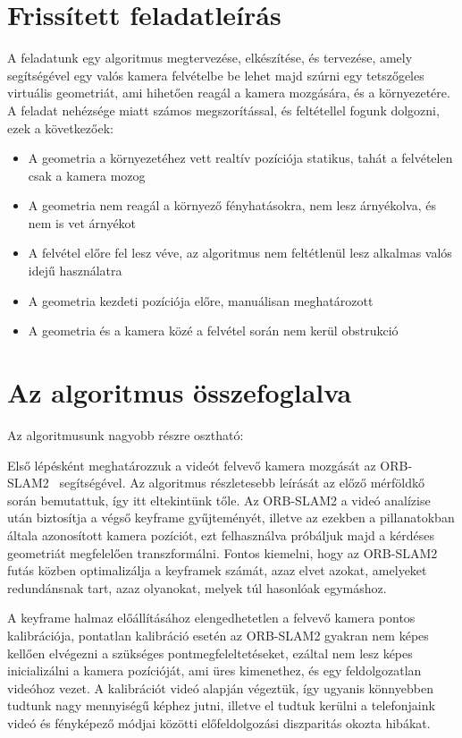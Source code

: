 \section{Frissített feladatleírás}

A feladatunk egy algoritmus megtervezése, elkészítése, és tervezése, amely segítségével egy valós kamera felvételbe be lehet majd szúrni egy tetszőgeles virtuális geometriát, ami hihetően reagál a kamera mozgására, és a környezetére.
A feladat nehézsége miatt számos megszorítással, és feltétellel fogunk dolgozni, ezek a következőek:

\begin{itemize}
	\item A geometria a környezetéhez vett realtív pozíciója statikus, tahát a felvételen csak a kamera mozog
	\item A geometria nem reagál a környező fényhatásokra, nem lesz árnyékolva, és nem is vet árnyékot
	\item A felvétel előre fel lesz véve, az algoritmus nem feltétlenül lesz alkalmas valós idejű használatra
	\item A geometria kezdeti pozíciója előre, manuálisan meghatározott
	\item A geometria és a kamera közé a felvétel során nem kerül obstrukció
\end{itemize}

\section{Az algoritmus összefoglalva}

Az algoritmusunk nagyobb részre osztható:

Első lépésként meghatározzuk a videót felvevő kamera mozgását az ORB-SLAM2~\cite{mur2015orb} segítségével.
Az algoritmus részletesebb leírását az előző mérföldkő során bemutattuk, így itt eltekintünk tőle.
Az ORB-SLAM2 a videó analízise után biztosítja a végső keyframe gyűjteményét, illetve az ezekben a pillanatokban általa azonosított kamera pozíciót, ezt felhasználva próbáljuk majd a kérdéses geometriát megfelelően transzformálni.
Fontos kiemelni, hogy az ORB-SLAM2 futás közben optimalizálja a keyframek számát, azaz elvet azokat, amelyeket redundánsnak tart, azaz olyanokat, melyek túl hasonlóak egymáshoz.

A keyframe halmaz előállításához elengedhetetlen a felvevő kamera pontos kalibrációja, pontatlan kalibráció esetén az ORB-SLAM2 gyakran nem képes kellően elvégezni a szükséges pontmegfeleltetéseket, ezáltal nem lesz képes inicializálni a kamera pozícióját, ami üres kimenethez, és egy feldolgozatlan videóhoz vezet.
A kalibrációt videó alapján végeztük, így ugyanis könnyebben tudtunk nagy mennyiségű képhez jutni, illetve el tudtuk kerülni a telefonjaink videó és fényképező módjai közötti előfeldolgozási diszparitás okozta hibákat.

